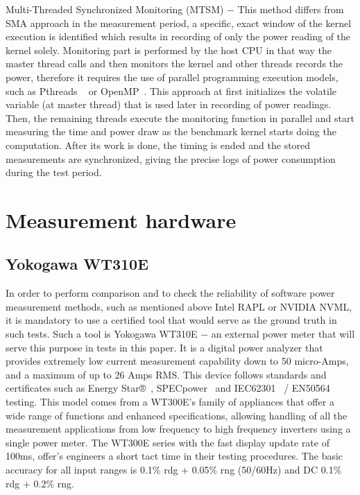 Multi-Threaded Synchronized Monitoring (MTSM) $-$ This method
differs from SMA approach in the measurement period, a specific,
exact window of the kernel execution is identified which results
in recording of only the power reading of the kernel solely.
Monitoring part is performed by the host CPU in that way the
master thread calls and then monitors the kernel and other
threads records the power, therefore it requires the use of
parallel programming execution models, such as Pthreads
~\cite{Pthreads} or
OpenMP~\cite{OpenMP}. This approach at first initializes the volatile
variable (at master thread) that is used later in recording of
power readings. Then, the remaining threads execute the monitoring
function in parallel and start measuring the time and power draw
as the benchmark kernel starts doing the computation. After its
work is done, the timing is ended and the stored measurements
are synchronized, giving the precise logs of power consumption
during the test period.

\section{Measurement hardware}

\subsection{Yokogawa WT310E}

In order to perform comparison and to check the reliability
of software power measurement methods, such as mentioned
above Intel RAPL or NVIDIA NVML, it is mandatory to use
a certified tool that would serve as the ground truth in
such tests. Such a tool is Yokogawa WT310E $-$ an external
power meter that will serve this purpose in tests in this paper.
It is a digital power analyzer that provides extremely low
current measurement capability down to 50 micro-Amps, and
a maximum of up to 26 Amps RMS\@. This device follows standards
and certificates such as Energy Star®~\cite{EnergyStar},
SPECpower~\cite{SPEC} and IEC62301~\cite{IEC} / EN50564~\cite{iTeh}
testing. This model comes from a WT300E's family of appliances
that offer a wide range of functions and enhanced specifications,
allowing handling of all the measurement applications from low
frequency to high frequency inverters using a single power meter.
The WT300E series with the fast display update rate of 100ms,
offer's engineers a short tact time in their testing procedures.
The basic accuracy for all input ranges is 0.1\% rdg + 0.05\%
rng (50/60Hz) and DC 0.1\% rdg + 0.2\% rng.

